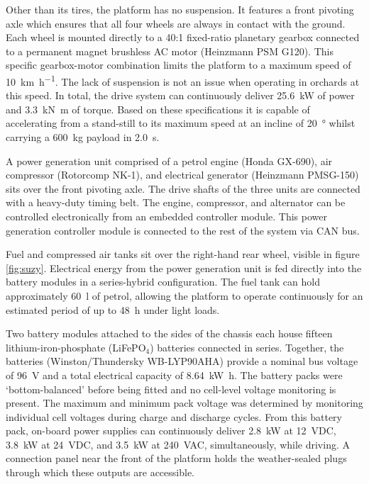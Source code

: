 \documentclass[preprint,authoryear,12pt]{elsarticle}
\begin{document}
        Other than its tires, the platform has no suspension.
        It features a front pivoting axle which ensures that all four wheels are always in contact with the ground.
        Each wheel is mounted directly to a 40:1 fixed-ratio planetary gearbox connected to a permanent magnet brushless AC motor (Heinzmann PSM G120).
        This specific gearbox-motor combination limits the platform to a maximum speed of \SI{10}{\kilo\meter\per\hour}.
        The lack of suspension is not an issue when operating in orchards at this speed.
        In total, the drive system can continuously deliver \SI{25.6}{\kilo\watt} of power and \SI{3.3}{\kilo\newton\meter} of torque.
        Based on these specifications it is capable of accelerating from a stand-still to its maximum speed at an incline of \SI{20}{\degree} whilst carrying a \SI{600}{\kilo\gram} payload in \SI{2.0}{\second}.

        A power generation unit comprised of a petrol engine (Honda GX-690), air compressor (Rotorcomp NK-1), and electrical generator (Heinzmann PMSG-150) sits over the front pivoting axle.
        The drive shafts of the three units are connected with a heavy-duty timing belt.
        The engine, compressor, and alternator can be controlled electronically from an embedded controller module.
        This power generation controller module is connected to the rest of the system via CAN bus.

        Fuel and compressed air tanks sit over the right-hand rear wheel, visible in figure \ref{fig:suzy}.
        Electrical energy from the power generation unit is fed directly into the battery modules in a series-hybrid configuration.
        The fuel tank can hold approximately \SI{60}{\litre} of petrol, allowing the platform to operate continuously for an estimated period of up to \SI{48}{\hour} under light loads.

        Two battery modules attached to the sides of the chassis each house fifteen lithium-iron-phosphate (LiFePO$_{\text{4}}$) batteries connected in series.
        Together, the batteries (Winston/Thundersky WB-LYP90AHA) provide a nominal bus voltage of \SI{96}{\volt} and a total electrical capacity of \SI{8.64}{\kilo\watt\hour}.
        The battery packs were `bottom-balanced' before being fitted and no cell-level voltage monitoring is present.
        The maximum and minimum pack voltage was determined by monitoring individual cell voltages during charge and discharge cycles.
        From this battery pack, on-board power supplies can continuously deliver \SI{2.8}{\kilo\watt} at \SI{12}{\volt}DC, \SI{3.8}{\kilo\watt} at \SI{24}{\volt}DC, and \SI{3.5}{\kilo\watt} at \SI{240}{\volt}AC, simultaneously, while driving.
        A connection panel near the front of the platform holds the weather-sealed plugs through which these outputs are accessible.
\end{document}
